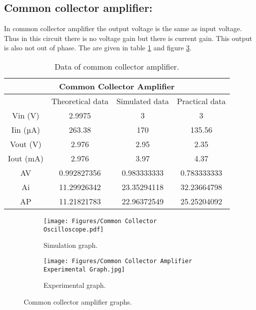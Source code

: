 \documentclass[a4paper, 12pt]{extarticle}
\begin{document}
\newpage
\restoregeometry
{}
\subsection{Common collector amplifier:}
In common collector amplifier the output voltage is the same as input voltage. Thus in this circuit there is no voltage gain but there is current gain. This output is also not out of phase. The are given in table \ref{tab:Datas of common collector amplifier} and figure \ref{fig:Common Collector Amplifier Graphs.}. 
\begin{table}[htbp]
  \centering
  \caption{Data of common collector amplifier.}
    \begin{tabular}{|c|c|c|c|}
    \toprule
    \multicolumn{4}{|c|}{Common Collector Amplifier} \\
    \midrule
          & Theoretical data & Simulated data & Practical data \\
    \midrule
    Vin (V) & 2.9975 & 3     & 3 \\
    \midrule
    Iin (µA) & 263.38 & 170   & 135.56 \\
    \midrule
    Vout (V) & 2.976 & 2.95  & 2.35 \\
    \midrule
    Iout (mA) & 2.976 & 3.97  & 4.37 \\
    \midrule
    AV    & 0.992827356 & 0.983333333 & 0.783333333 \\
    \midrule
    Ai    & 11.29926342 & 23.35294118 & 32.23664798 \\
    \midrule
    AP    & 11.21821783 & 22.96372549 & 25.25204092 \\
    \bottomrule
    \end{tabular}%
  \label{tab:Datas of common collector amplifier}%
\end{table}%

\begin{figure}[htbp]
    \centering
        \begin{subfigure}[h]{0.48\textwidth}
        \centering
            \texttt{[image: Figures/Common Collector Oscilloscope.pdf]}
            \caption{Simulation graph.}
            \label{fig:Common Collector Amplifier Simulation Graph}
        \end{subfigure}
        \hfill
        \begin{subfigure}[h]{0.48\textwidth}
        \centering
            \texttt{[image: Figures/Common Collector Amplifier Experimental Graph.jpg]}
            \caption{Experimental graph.}
            \label{fig:Common Collector Amplifier Experimental Graph}
        \end{subfigure}
        \caption{Common collector amplifier graphs.}
        \label{fig:Common Collector Amplifier Graphs.}
\end{figure}
\end{document}
